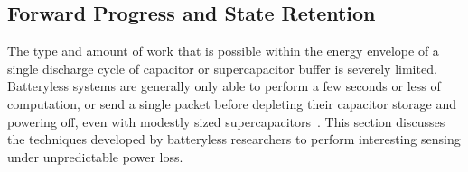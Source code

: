 \subsection{Forward Progress and State Retention}
The type and amount of work that is possible within the energy envelope of a single discharge cycle of capacitor or supercapacitor buffer is severely limited.
Batteryless systems are generally only able to perform a few seconds or less of computation, or send a single packet before depleting their capacitor storage and powering off, even with modestly sized supercapacitors~\cite{yervaGrafting12,hesterFlicker17,colinReconfigurable18,nardello2019camaroptera}.
This section discusses the techniques developed by batteryless researchers to perform interesting sensing under unpredictable power loss.

